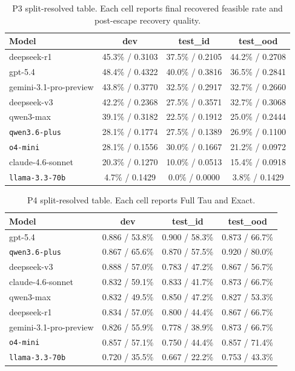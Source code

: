 \begin{table}[t]
\caption{P3 split-resolved table. Each cell reports final recovered feasible rate and post-escape recovery quality.}
\label{tab:appendix_p3_split}
\centering
\scriptsize
\setlength{\tabcolsep}{4pt}
\renewcommand{\arraystretch}{1.08}
\begin{tabular}{lccc}
\toprule
Model & dev & test\_id & test\_ood \\
\midrule
deepseek-r1 & 45.3\% / 0.3103 & 37.5\% / 0.2105 & 44.2\% / 0.2708 \\
gpt-5.4 & 48.4\% / 0.4322 & 40.0\% / 0.3816 & 36.5\% / 0.2841 \\
gemini-3.1-pro-preview & 43.8\% / 0.3770 & 32.5\% / 0.2917 & 32.7\% / 0.2660 \\
deepseek-v3 & 42.2\% / 0.2368 & 27.5\% / 0.3571 & 32.7\% / 0.3068 \\
qwen3-max & 39.1\% / 0.3182 & 22.5\% / 0.1912 & 25.0\% / 0.2444 \\
\texttt{qwen3.6-plus} & 28.1\% / 0.1774 & 27.5\% / 0.1389 & 26.9\% / 0.1100 \\
\texttt{o4-mini} & 28.1\% / 0.1556 & 30.0\% / 0.1667 & 21.2\% / 0.0972 \\
claude-4.6-sonnet & 20.3\% / 0.1270 & 10.0\% / 0.0513 & 15.4\% / 0.0918 \\
\texttt{llama-3.3-70b} & 4.7\% / 0.1429 & 0.0\% / 0.0000 & 3.8\% / 0.1429 \\
\bottomrule
\end{tabular}
\end{table}

\begin{table}[t]
\caption{P4 split-resolved table. Each cell reports Full Tau and Exact.}
\label{tab:appendix_p4_split}
\centering
\scriptsize
\setlength{\tabcolsep}{4pt}
\renewcommand{\arraystretch}{1.08}
\begin{tabular}{lccc}
\toprule
Model & dev & test\_id & test\_ood \\
\midrule
gpt-5.4 & 0.886 / 53.8\% & 0.900 / 58.3\% & 0.873 / 66.7\% \\
\texttt{qwen3.6-plus} & 0.867 / 65.6\% & 0.870 / 57.5\% & 0.920 / 80.0\% \\
deepseek-v3 & 0.888 / 57.0\% & 0.783 / 47.2\% & 0.867 / 56.7\% \\
claude-4.6-sonnet & 0.832 / 59.1\% & 0.833 / 41.7\% & 0.873 / 66.7\% \\
qwen3-max & 0.832 / 49.5\% & 0.850 / 47.2\% & 0.827 / 53.3\% \\
deepseek-r1 & 0.834 / 57.0\% & 0.800 / 44.4\% & 0.867 / 66.7\% \\
gemini-3.1-pro-preview & 0.826 / 55.9\% & 0.778 / 38.9\% & 0.873 / 66.7\% \\
\texttt{o4-mini} & 0.857 / 57.1\% & 0.750 / 44.4\% & 0.857 / 71.4\% \\
\texttt{llama-3.3-70b} & 0.720 / 35.5\% & 0.667 / 22.2\% & 0.753 / 43.3\% \\
\bottomrule
\end{tabular}
\end{table}

